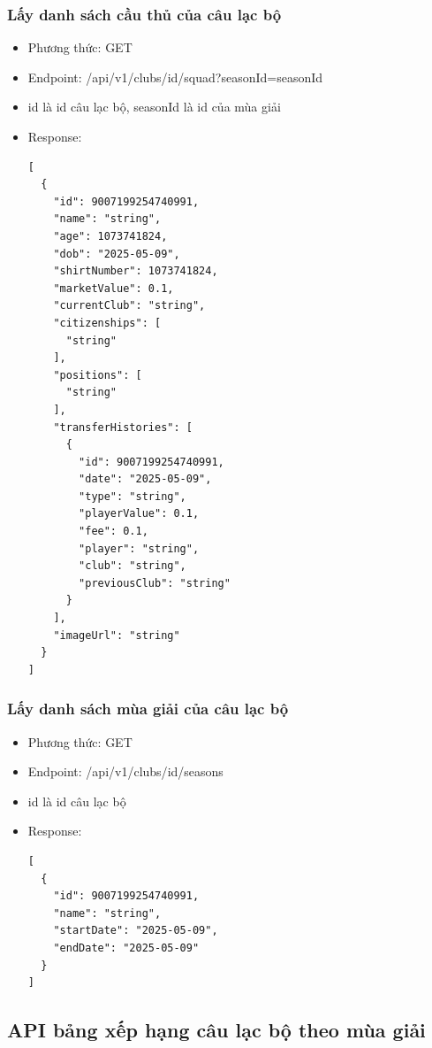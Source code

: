 \documentclass[../BTL.tex]{subfiles}
\begin{document}
\subsubsection{ Lấy danh sách cầu thủ của câu lạc bộ}
\begin{itemize}
    \item Phương thức: GET
    \item Endpoint: /api/v1/clubs/{id}/squad?seasonId={seasonId}
    \item {id} là id câu lạc bộ, {seasonId} là id của mùa giải
    \item Response:
        \begin{verbatim}
[
  {
    "id": 9007199254740991,
    "name": "string",
    "age": 1073741824,
    "dob": "2025-05-09",
    "shirtNumber": 1073741824,
    "marketValue": 0.1,
    "currentClub": "string",
    "citizenships": [
      "string"
    ],
    "positions": [
      "string"
    ],
    "transferHistories": [
      {
        "id": 9007199254740991,
        "date": "2025-05-09",
        "type": "string",
        "playerValue": 0.1,
        "fee": 0.1,
        "player": "string",
        "club": "string",
        "previousClub": "string"
      }
    ],
    "imageUrl": "string"
  }
]
        \end{verbatim}
\end{itemize}

\subsubsection{ Lấy danh sách mùa giải của câu lạc bộ}
\begin{itemize}
    \item Phương thức: GET
    \item Endpoint: /api/v1/clubs/{id}/seasons
    \item {id} là id câu lạc bộ
    \item Response:
        \begin{verbatim}
[
  {
    "id": 9007199254740991,
    "name": "string",
    "startDate": "2025-05-09",
    "endDate": "2025-05-09"
  }
]
        \end{verbatim}
\end{itemize}
\subsection{ API bảng xếp hạng câu lạc bộ theo mùa giải}
\end{document}
